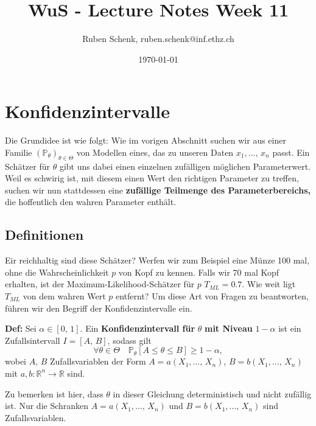 \documentclass[a4paper]{extarticle}
\title{WuS - Lecture Notes Week 11}
\author{Ruben Schenk, ruben.schenk@inf.ethz.ch}
\date{\today}
\begin{document}
\maketitle

\section{Konfidenzintervalle}

Die Grundidee ist wie folgt: Wie im vorigen Abschnitt suchen wir aus einer Familie $(\mathbb{P}_{\theta})_{\theta \in \Theta}$ von Modellen eines, das zu unseren Daten $x_1,..., \, x_n$ passt. Ein Schätzer für $\theta$ gibt uns dabei einen einzelnen zufälligen möglichen Parameterwert. Weil es schwirig ist, mit diesem einen Wert den richtigen Parameter zu treffen, suchen wir nun stattdessen eine \textbf{zufällige Teilmenge des Parameterbereichs,} die hoffentlich den wahren Parameter enthält.

\subsection{Definitionen}

Eir reichhaltig sind diese Schätzer? Werfen wir zum Beispiel eine Münze 100 mal, ohne die Wahrscheinlichkeit $p$ von Kopf zu kennen. Falls wir 70 mal Kopf erhalten, ist der Maximum-Likelihood-Schätzer für $p$ $T_{ML} = 0.7$. Wie weit ligt $T_{ML}$ von dem wahren Wert $p$ entfernt? Um diese Art von Fragen zu beantworten, führen wir den Begriff der Konfidenzintervalle ein.

\textbf{Def:} Sei $\alpha \in [0, \, 1]$. Ein \textbf{Konfidenzintervall für} $\theta$ \textbf{mit Niveau} $1 - \alpha$ ist ein Zufallsintervall $I = [A, \, B]$, sodass gilt
\[
    \forall \theta \in \Theta \quad \mathbb{P}_{\theta}[A \leq \theta \leq B] \geq 1 - \alpha,
\]
wobei $A, \, B$ Zufallsvariablen der Form $A = a(X_1,..., \, X_n)$, $B = b(X_1,..., \, X_n)$ mit $a,b : \mathbb{R}^n \to \mathbb{R}$ sind.

Zu bemerken ist hier, dass $\theta$ in dieser Gleichung deterministisch und nicht zufällig ist. Nur die Schranken $A = a(X_1,..., \, X_n)$ und $B = b(X_1,..., \, X_n)$ sind Zufallsvariablen.
\end{document}

